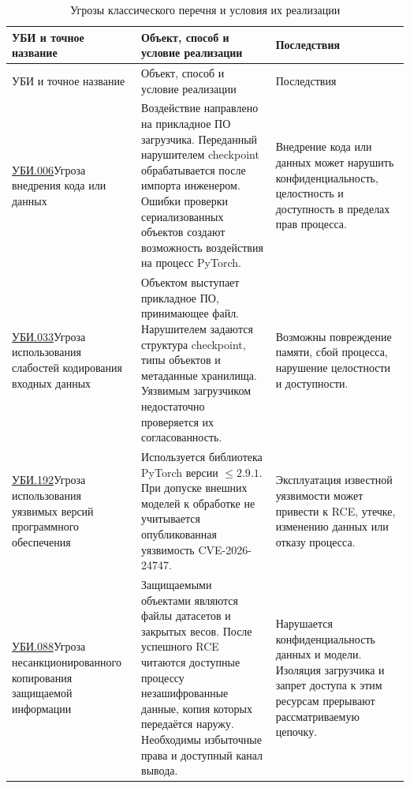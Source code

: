 \documentclass[12pt,a4paper]{report}
\begin{document}
\begingroup\small
\begin{longtable}{|P{4.3cm}|P{6.0cm}|P{3.5cm}|}
\caption{Угрозы классического перечня и условия их реализации}\label{tab:step5-threats}\\
\hline
{}
УБИ и точное название & Объект, способ и условие реализации & Последствия \\
\hline
\endfirsthead
\hline
{}
УБИ и точное название & Объект, способ и условие реализации & Последствия \\
\hline
\endhead
\href{https://bdu.fstec.ru/threat/ubi.006}{УБИ.006}\newline Угроза внедрения кода или данных & Воздействие направлено на прикладное ПО загрузчика. Переданный нарушителем checkpoint обрабатывается после импорта инженером. Ошибки проверки сериализованных объектов создают возможность воздействия на процесс PyTorch. & Внедрение кода или данных может нарушить конфиденциальность, целостность и доступность в пределах прав процесса. \\
\hline
\href{https://bdu.fstec.ru/threat/ubi.033}{УБИ.033}\newline Угроза использования слабостей кодирования входных данных & Объектом выступает прикладное ПО, принимающее файл. Нарушителем задаются структура checkpoint, типы объектов и метаданные хранилища. Уязвимым загрузчиком недостаточно проверяется их согласованность. & Возможны повреждение памяти, сбой процесса, нарушение целостности и доступности. \\
\hline
\href{https://bdu.fstec.ru/threat/ubi.192}{УБИ.192}\newline Угроза использования уязвимых версий программного обеспечения & Используется библиотека PyTorch версии $\leq 2.9.1$. При допуске внешних моделей к обработке не учитывается опубликованная уязвимость CVE-2026-24747. & Эксплуатация известной уязвимости может привести к RCE, утечке, изменению данных или отказу процесса. \\
\hline
\href{https://bdu.fstec.ru/threat/ubi.088}{УБИ.088}\newline Угроза несанкционированного копирования защищаемой информации & Защищаемыми объектами являются файлы датасетов и закрытых весов. После успешного RCE читаются доступные процессу незашифрованные данные, копия которых передаётся наружу. Необходимы избыточные права и доступный канал вывода. & Нарушается конфиденциальность данных и модели. Изоляция загрузчика и запрет доступа к этим ресурсам прерывают рассматриваемую цепочку. \\
\hline
\end{longtable}
\endgroup
\end{document}
